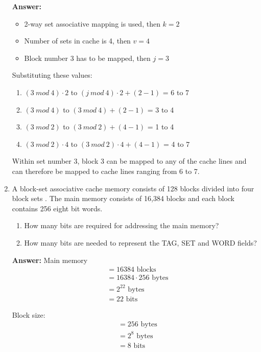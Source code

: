 \documentclass[12pt]{article}
\begin{document}
\begin{enumerate}
  \textbf{Answer:}
  \begin{itemize}
    \item 2-way set associative mapping is used, then $k = 2$
    \item Number of sets in cache is 4, then $v = 4$
    \item Block number $3$ has to be mapped, then $j = 3$
  \end{itemize}

  Substituting these values:

  \begin{enumerate}
    \item $(3 \ mod \ 4) \cdot 2$ to $(j \ mod \ 4) \cdot 2 + (2 - 1)$ = 6 to 7
    \item $(3 \ mod \ 4)$ to $(3 \ mod \ 4) + (2 - 1)$ = 3 to 4
    \item $(3 \ mod \ 2)$ to $(3 \ mod \ 2) + (4 - 1)$ = 1 to 4
    \item $(3 \ mod \ 2) \cdot 4$ to $(3 \ mod \ 2) \cdot 4 + (4 - 1)$ = 4 to 7
  \end{enumerate}
 
  Within set number 3, block 3 can be mapped to any of the cache lines and can therefore be mapped to cache lines ranging from 6 to 7.
 
  \item A block-set associative cache memory consists of 128 blocks divided into four block sets . The main memory consists of 16,384 blocks and each block contains 256 eight bit words.

  \begin{enumerate}
    \item How many bits are required for addressing the main memory?
    \item How many bits are needed to represent the TAG, SET and WORD fields?
  \end{enumerate}

  \textbf{Answer:}
  Main memory
  \begin{align*}
    &= 16384 \text{ blocks} \\
    &= 16384 \cdot 256 \text{ bytes} \\
    &= 2^{22} \text{ bytes} \\
    &= 22 \text{ bits}
  \end{align*}

  Block size:
  \begin{align*}
    &= 256 \text{ bytes} \\
    &= 2^8 \text{ bytes}\\
    &= 8 \text{ bits}
  \end{align*}


\end{enumerate}
\end{document}
